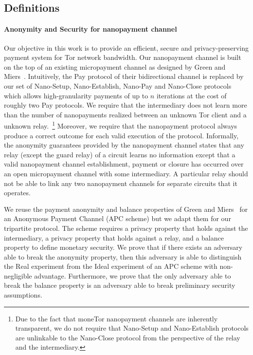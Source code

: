 
\subsection{Definitions}

\paragraph*{Anonymity and Security for nanopayment channel}
Our objective in this work is to provide an efficient, secure and
privacy-preserving payment system for Tor network bandwidth. Our nanopayment
channel is built on the top of an existing micropayment channel as designed by
Green and Miers~\cite{green2017bolt}. Intuitively, the Pay protocol of their
bidirectional channel is replaced by our set of Nano-Setup, Nano-Establish,
Nano-Pay and Nano-Close protocols which allows high-granularity payments of up
to $n$ iterations at the cost of roughly two Pay protocols.
We require that the intermediary does not learn more than the number of
nanopayments realized between an unknown Tor client and a unknown
relay.~\footnote{Due to the fact that moneTor nanopayment channels are
  inherently transparent, we do not require that Nano-Setup and Nano-Establish
  protocols are unlinkable to the Nano-Close protocol from the perspective of
  the relay and the intermediary.} Moreover, we require that the nanopayment
protocol always produce a correct outcome for each valid execution of the
protocol.  Informally, the anonymity guarantees provided by the nanopayment
channel states that any relay (except the guard relay) of a circuit learns no
information except that a valid nanopayment channel establishment, payment or
closure has occurred over an open micropayment channel with some intermediary. A
particular relay should not be able to link any two nanopayment channels for
separate circuits that it operates.

We reuse the payment anonymity and balance properties of Green and
Miers~\cite{bolt-eprint} for an Anonymous Payment Channel (APC scheme) but we
adapt them for our tripartite protocol. The scheme requires a privacy property
that holds against the intermediary, a privacy property that holds against a
relay, and a balance property to define monetary security.  We prove that if
there exists an adversary able to break the anonymity property, then this
adversary is able to distinguish the Real experiment from the Ideal experiment
of an APC scheme with non-negligible advantage. Furthermore, we prove that the
only adversary able to break the balance property is an adversary able to break
preliminary security assumptions.


